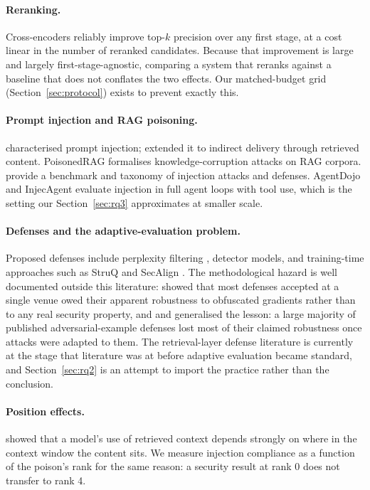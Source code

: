 \documentclass{article}
\begin{document}
\paragraph{Reranking.} Cross-encoders \citep{nogueira2020passage} reliably
improve top-$k$ precision over any first stage, at a cost linear in the number
of reranked candidates. Because that improvement is large and largely
first-stage-agnostic, comparing a system that reranks against a baseline that
does not conflates the two effects. Our matched-budget grid
(Section~\ref{sec:protocol}) exists to prevent exactly this.

\paragraph{Prompt injection and RAG poisoning.} \citet{perez2022injection}
characterised prompt injection; \citet{greshake2023indirect} extended it to
indirect delivery through retrieved content. PoisonedRAG
\citep{zou2024poisonedrag} formalises knowledge-corruption attacks on RAG
corpora. \citet{liu2024formalizing} provide a benchmark and taxonomy of
injection attacks and defenses. AgentDojo \citep{debenedetti2024agentdojo} and
InjecAgent \citep{zhan2024injecagent} evaluate injection in full agent loops
with tool use, which is the setting our Section~\ref{sec:rq3} approximates at
smaller scale.

\paragraph{Defenses and the adaptive-evaluation problem.} Proposed defenses
include perplexity filtering \citep{alon2023detecting,jain2023baseline},
detector models, and training-time approaches such as StruQ
\citep{chen2024struq} and SecAlign \citep{chen2025secalign}. The methodological
hazard is well documented outside this literature:
\citet{athalye2018obfuscated} showed that most defenses accepted at a single
venue owed their apparent robustness to obfuscated gradients rather than to any
real security property, and \citet{carlini2019evaluating} and
\citet{tramer2020adaptive} generalised the lesson: a large majority of published
adversarial-example defenses lost most of their claimed robustness once attacks
were adapted to them. The retrieval-layer defense
literature is currently at the stage that literature was at before adaptive
evaluation became standard, and Section~\ref{sec:rq2} is an attempt to import
the practice rather than the conclusion.

\paragraph{Position effects.} \citet{liu2024lost} showed that a model's use of
retrieved context depends strongly on where in the context window the content
sits. We measure injection compliance as a function of the poison's rank for the
same reason: a security result at rank 0 does not transfer to rank 4.
\end{document}
